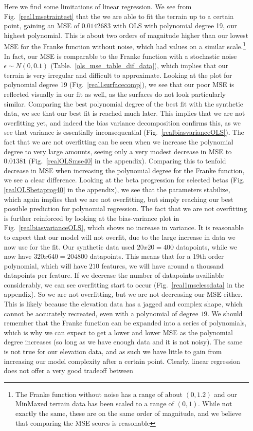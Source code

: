 \documentclass[twocolumn,10pt,cleanfoot]{asme2ej}
\begin{document}
Here we find some limitations of linear regression. We see from Fig.~\ref{real1msetraintest} that the we are able to fit the terrain up to a certain point, gaining an MSE of $0.0142683$ with OLS with polynomial degree 19, our highest polynomial. This is about two orders of magnitude higher than our lowest MSE for the Franke function without noise, which had values on a similar scale.\footnote{The Franke function without noise has a range of about $(0,1.2)$ and our MinMaxed terrain data has been scaled to a range of $(0,1)$. While not exactly the same, these are on the same order of magnitude, and we believe that comparing the MSE scores is reasonable} In fact, our MSE is comparable to the Franke function with a stochastic noise $\epsilon \sim N(0,0.1)$ (Table.~\ref{ols_mse_table_dif_data}), which implies that our terrain is very irregular and difficult to approximate. Looking at the plot for polynomial degree 19 (Fig.~\ref{real1surfacecomp}), we see that our poor MSE is reflected visually in our fit as well, as the surfaces do not look particularly similar. Comparing the best polynomial degree of the best fit with the synthetic data, we see that our best fit is reached much later. This implies that we are not overfitting yet, and indeed the bias variance decomposition confirms this, as we see that variance is essentially inconsequential (Fig.~\ref{realbiasvarianceOLS}). The fact that we are not overfitting can be seen when we increase the polynomial degree to very large amounts, seeing only a very modest decrease in MSE to $0.01381$ (Fig.~\ref{realOLSmse40} in the appendix). Comparing this to tenfold decrease in MSE when increasing the polynomial degree for the Franke function, we see a clear difference. Looking at the beta progression for selected betas (Fig.\ref{realOLSbetaprog40} in the appendix), we see that the parameters stabilize, which again implies that we are not overfitting, but simply reaching our best possible prediction for polynomial regression. The fact that we are not overfitting is further reinforced by looking at the bias-variance plot in Fig.~\ref{realbiasvarianceOLS}, which shows no increase in variance. It is reasonable to expect that our model will not overfit, due to the large increase in data we now use for the fit. Our synthetic data used $20 x 20 = 400$ datapoints, while we now have $320 x 640 = 204 800$ datapoints. This means that for a 19th order polynomial, which will have $210$ features, we will have around a thousand datapoints per feature. If we decrease the number of datapoints availiable considerably, we can see overfitting start to occur (Fig.~\ref{real1mselessdata} in the appendix). So we are not overfitting, but we are not decreasing our MSE either. This is likely because the elevation data has a jagged and complex shape, which cannot be accurately recreated, even with a polynomial of degree $19$. We should remember that the Franke function can be expanded into a series of polynomials, which is why we can expect to get a lower and lower MSE as the polynomial degree increases (so long as we have enough data and it is not noisy). The same is not true for our elevation data, and as such we have little to gain from increasing our model complexity after a certain point. Clearly, linear regression does not offer a very good tradeoff between 
\end{document}
